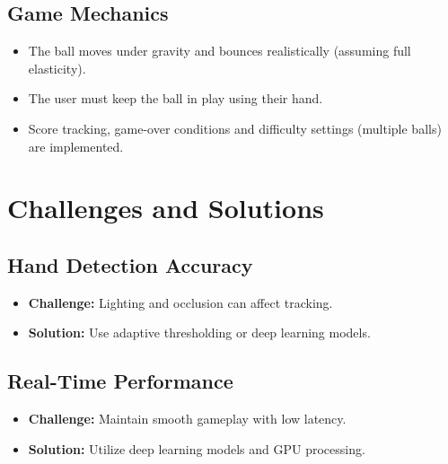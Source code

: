 \documentclass{article}
\begin{document}
\begin{center}
    \begin{minipage}[t]{0.96\textwidth}
        \subsection*{\large{Game Mechanics}}
        \begin{itemize}
            \item The ball moves under gravity and bounces realistically (assuming full elasticity).
            \item The user must keep the ball in play using their hand.
            \item Score tracking, game-over conditions and difficulty settings (multiple balls) are implemented.
        \end{itemize}
    \end{minipage}
\end{center}

\vspace*{5pt}

\section*{\Large{Challenges and Solutions}}

\begin{center}
    \begin{minipage}[t]{0.48\textwidth}
        \subsection*{\large{Hand Detection Accuracy}}
        \begin{itemize}
            \item \textbf{Challenge:} Lighting and occlusion can affect tracking.
            \item \textbf{Solution:} Use adaptive thresholding or deep learning models.
        \end{itemize}
    \end{minipage}
    \begin{minipage}[t]{0.48\textwidth}
        \subsection*{\large{Real-Time Performance}}
        \begin{itemize}
            \item \textbf{Challenge:} Maintain smooth gameplay with low latency.
            \item \textbf{Solution:} Utilize deep learning models and GPU processing.
        \end{itemize}
    \end{minipage}
\end{center}
\end{document}
